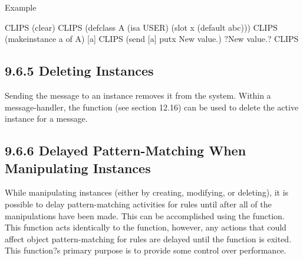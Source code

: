 \documentclass[letterpaper,10pt,english]{sphinxmanual}
\begin{document}
Example

\begin{sphinxVerbatim}[commandchars=\\\{\}]
CLIPS\PYGZgt{} (clear)
CLIPS\PYGZgt{}
(defclass A (is\PYGZhy{}a USER)
(slot x (default abc)))
CLIPS\PYGZgt{} (make\PYGZhy{}instance a of A)
[a]
CLIPS\PYGZgt{} (send [a] put\PYGZhy{}x \PYGZdq{}New value.\PYGZdq{})
?New value.?
CLIPS\PYGZgt{}
\end{sphinxVerbatim}


\subsection{9.6.5 Deleting Instances}
\label{\detokenize{cool:deleting-instances}}
Sending the  message to an instance removes it from the
system. Within a message-handler, the  function (see
section 12.16) can be used to delete the active instance for a message.


\begin{sphinxVerbatim}[commandchars=\\\{\}]
  
\end{sphinxVerbatim}


\subsection{9.6.6 Delayed Pattern-Matching When Manipulating Instances}
\label{\detokenize{cool:delayed-pattern-matching-when-manipulating-instances}}
While manipulating instances (either by creating, modifying, or
deleting), it is possible to delay pattern-matching activities for rules
until after all of the manipulations have been made. This can be
accomplished using the  function. This
function acts identically to the  function, however, any
actions that could affect object pattern-matching for rules are delayed
until the function is exited. This function?s primary purpose is to
provide some control over performance.


\begin{sphinxVerbatim}[commandchars=\\\{\}]
 
\end{sphinxVerbatim}
\end{document}
